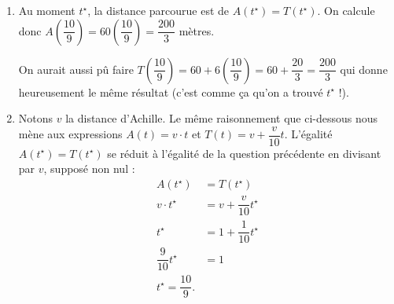 {\begin{enumerate}
	\item
		Au moment $t^\star$, la distance parcourue est de $A(t^\star) = T(t^\star)$.
		On calcule donc $A\left(\dfrac{10}9\right) = 60 \left(\dfrac{10}9\right) = \dfrac{200}{3}$ mètres.
		
		On aurait aussi pû faire $T\left(\dfrac{10}9\right) = 60 + 6 \left(\dfrac{10}9\right) = 60 + \dfrac{20}3 = \dfrac{200}3$ qui donne heureusement le même résultat (c'est comme ça qu'on a trouvé $t^\star$ !).
		
	\item 
		Notons $v$ la distance d'Achille.
		Le même raisonnement que ci-dessous nous mène aux expressions $A(t) = v\cdot t$ et $T(t) = v + \dfrac{v}{10} t$.
		L'égalité $A(t^\star) = T(t^\star)$ se réduit à l'égalité de la question précédente en divisant par $v$, supposé non nul :
			\begin{align*}
				A(t^\star) &= T(t^\star) \\
				v\cdot t^\star &= v + \dfrac{v}{10} t^\star \\
				t^\star &= 1 + \dfrac1{10} t^\star \\
				\dfrac9{10} t^\star &= 1 \\
				t^\star = \dfrac{10}9.
			\end{align*}
	\end{enumerate}

}


